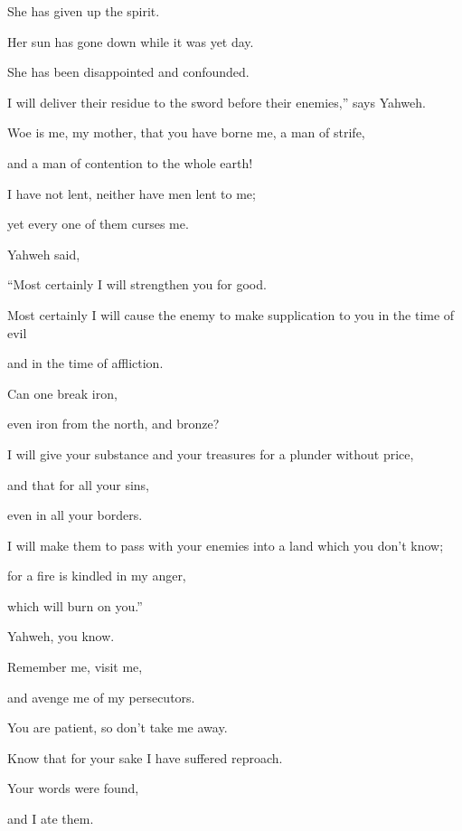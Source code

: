{\par }{\QB She has given up the spirit.
\par }{\Q Her sun has gone down while it was yet day.
\par }{\QB She has been disappointed and confounded.
\par }{\QB I will deliver their residue to the sword before their enemies,” says Yahweh.
\par }{\BB \par }{\Q {}Woe is me, my mother, that you have borne me, a man of strife,
\par }{\QB and a man of contention to the whole earth!
\par }{\Q I have not lent, neither have men lent to me;
\par }{\QB yet every one of them curses me.
\par }{\PP {}Yahweh said,
\par }{\Q “Most certainly I will strengthen you for good.
\par }{\QB Most certainly I will cause the enemy to make supplication to you in the time of evil
\par }{\QB and in the time of affliction.
\par }{\Q {}Can one break iron,
\par }{\QB even iron from the north, and bronze?
\par }{\Q {}I will give your substance and your treasures for a plunder without price,
\par }{\QB and that for all your sins,
\par }{\QB even in all your borders.
\par }{\Q {}I will make them to pass with your enemies into a land which you don’t know;
\par }{\QB for a fire is kindled in my anger,
\par }{\QB which will burn on you.”
\par }{\BB \par }{\Q {}Yahweh, you know.
\par }{\QB Remember me, visit me,
\par }{\QB and avenge me of my persecutors.
\par }{\Q You are patient, so don’t take me away.
\par }{\QB Know that for your sake I have suffered reproach.
\par }{\Q {}Your words were found,
\par }{\QB and I ate them.
}
